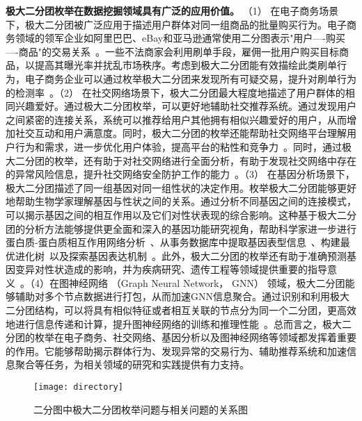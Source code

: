 \textbf{极大二分团枚举在数据挖掘领域具有广泛的应用价值。} （1） 在电子商务场景下，极大二分团被广泛应用于描述用户群体对同一组商品的批量购买行为。电子商务领域的领军企业如阿里巴巴、eBay和亚马逊通常使用二分图表示"用户----购买----商品"的交易关系~\cite{MEB20}。一些不法商家会利用刷单手段，雇佣一批用户购买目标商品，以提高其曝光率并扰乱市场秩序。考虑到极大二分团能有效描绘此类刷单行为，电子商务企业可以通过枚举极大二分团来发现所有可疑交易，提升对刷单行为的检测率~\cite{clickfarm21,MEB20,MEB22,skylinechinese23}。（2） 在社交网络场景下，极大二分团最大程度地描述了用户群体的相同兴趣爱好。通过极大二分团枚举，可以更好地辅助社交推荐系统。通过发现用户之间紧密的连接关系，系统可以推荐给用户其他拥有相似兴趣爱好的用户，从而增加社交互动和用户满意度。同时，极大二分团的枚举还能帮助社交网络平台理解用户行为和需求，进一步优化用户体验，提高平台的粘性和竞争力~\cite{minel06,MBEchinese17}。同时，通过极大二分团的枚举，还有助于对社交网络进行全面分析，有助于发现社交网络中存在的异常风险信息，提升社交网络安全防护工作的能力~\cite{dangerous19,dangerous05}。（3） 在基因分析场景下，极大二分团描述了同一组基因对同一组性状的决定作用。枚举极大二分团能够更好地帮助生物学家理解基因与性状之间的关系。通过分析不同基因之间的连接模式，可以揭示基因之间的相互作用以及它们对性状表现的综合影响。这种基于极大二分团的分析方法能够提供更全面和深入的基因功能研究视角，帮助科学家进一步进行蛋白质-蛋白质相互作用网络分析~\cite{protein11}、从事务数据库中提取基因表型信息~\cite{gene11}、构建最优进化树~\cite{tree04}以及探索基因表达机制~\cite{geneexp11}。此外，极大二分团的枚举还有助于准确预测基因变异对性状造成的影响，并为疾病研究、遗传工程等领域提供重要的指导意义~\cite{gene22,iMBEA14,protein21}。（4）在图神经网络 （Graph Neural Network， GNN） 领域，极大二分团能够辅助对多个节点数据进行打包，从而加速GNN信息聚合。通过识别和利用极大二分团结构，可以将具有相似特征或者相互关联的节点分为同一个二分团，更高效地进行信息传递和计算，提升图神经网络的训练和推理性能~\cite{Pqbiclique21,Pqbiclique23,Pq23}。总而言之，极大二分团的枚举在电子商务、社交网络、基因分析以及图神经网络等领域都发挥着重要的作用。它能够帮助揭示群体行为、发现异常的交易行为、辅助推荐系统和加速信息聚合等任务，为相关领域的研究和实践提供有力支持。

\begin{figure} [t]
  \centering
  \vspace{0.1in}
  \texttt{[image: directory]}
  \vspace{0.1in}
  \caption{二分图中极大二分团枚举问题与相关问题的关系图}
  \label{fig:directory}
\end{figure}

